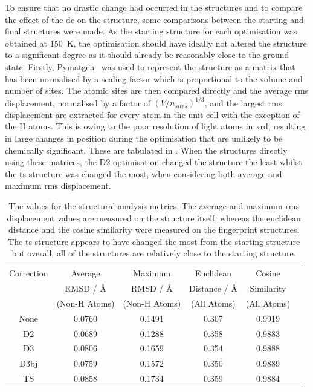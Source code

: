 To ensure that no drastic change had occurred in the structures and to compare the effect of the \acrshort{dc} on the structure, some comparisons between the starting and final structures were made. As the starting structure for each optimisation was obtained at \SI{150}{K}, the optimisation should have ideally not altered the structure to a significant degree as it should already be reasonably close to the ground state. Firstly, Pymatgen~\cite{Ong2013} was used to represent the structure as a matrix that has been normalised by a scaling factor which is proportional to the volume and number of sites. The atomic sites are then compared directly and the average \acrshort{rms} displacement, normalised by a factor of \((V/n_{sites})^{1/3}\), and the largest \acrshort{rms} displacement are extracted for every atom in the unit cell with the exception of the H atoms. This is owing to the poor resolution of light atoms in \acrshort{xrd}, resulting in large changes in position during the optimisation that are unlikely to be chemically significant. These are tabulated in . When the structures directly using these matrices, the D2 optimisation changed the structure the least whilst the \acrshort{ts} structure was changed the most, when considering both average and maximum \acrshort{rms} displacement.

\begin{table}[h]
\centering
\begin{tabular}{@{}cccccc@{}}
\toprule
Correction & Average & Maximum & Euclidean & Cosine \\
 & RMSD / {\AA} & RMSD / {\AA} & Distance / {\AA} & Similarity \\ 
 & (Non-H Atoms) & (Non-H Atoms) & (All Atoms) & (All Atoms) \\ \midrule
None &
  0.0760 &
  0.1491 &
  0.307 &
  0.9919 \\
D2 &
  0.0689 &
  0.1288 &
  0.358 &
  0.9883 \\
D3 &
 0.0806 & 
 0.1659 &
 0.354  & 
 0.9888 & \\
D3\acrshort{bj} &
  0.0759 &
  0.1572 &
  0.350 &
  0.9889 \\
TS &
  0.0858 &
  0.1734 &
  0.359 &
  0.9884 \\ \bottomrule
\end{tabular}
\captionsetup{font = footnotesize, justification = centering}
\caption[The Values for the Structural Analysis Metrics]{The values for the structural analysis metrics. The average and maximum \acrshort{rms} displacement values are measured on the structure itself, whereas the euclidean distance and the cosine similarity were measured on the fingerprint structures. The \acrshort{ts} structure appears to have changed the most from the starting structure but overall, all of the structures are relatively close to the starting structure.}
\label{tab:struct_similarity}
\end{table}

